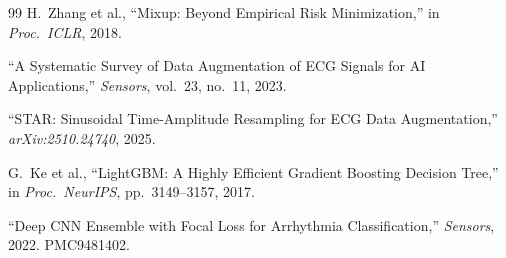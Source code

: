 \documentclass[11pt,a4paper]{article}
\begin{document}
\begin{thebibliography}{99}
H.\ Zhang et al.,
``Mixup: Beyond Empirical Risk Minimization,''
in \textit{Proc.\ ICLR}, 2018.

``A Systematic Survey of Data Augmentation of ECG Signals for AI Applications,''
\textit{Sensors}, vol.~23, no.~11, 2023.

``STAR: Sinusoidal Time-Amplitude Resampling for ECG Data Augmentation,''
\textit{arXiv:2510.24740}, 2025.

G.\ Ke et al.,
``LightGBM: A Highly Efficient Gradient Boosting Decision Tree,''
in \textit{Proc.\ NeurIPS}, pp.~3149--3157, 2017.

``Deep CNN Ensemble with Focal Loss for Arrhythmia Classification,''
\textit{Sensors}, 2022. PMC9481402.

\end{thebibliography}
\end{document}
